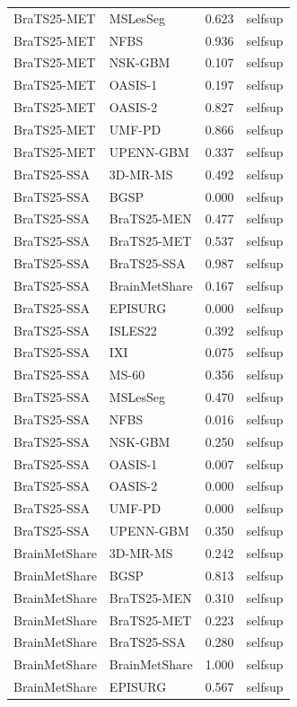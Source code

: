 \begin{tabular}{llrl}
BraTS25-MET & MSLesSeg & 0.623 & selfsup \\
BraTS25-MET & NFBS & 0.936 & selfsup \\
BraTS25-MET & NSK-GBM & 0.107 & selfsup \\
BraTS25-MET & OASIS-1 & 0.197 & selfsup \\
BraTS25-MET & OASIS-2 & 0.827 & selfsup \\
BraTS25-MET & UMF-PD & 0.866 & selfsup \\
BraTS25-MET & UPENN-GBM & 0.337 & selfsup \\
BraTS25-SSA & 3D-MR-MS & 0.492 & selfsup \\
BraTS25-SSA & BGSP & 0.000 & selfsup \\
BraTS25-SSA & BraTS25-MEN & 0.477 & selfsup \\
BraTS25-SSA & BraTS25-MET & 0.537 & selfsup \\
BraTS25-SSA & BraTS25-SSA & 0.987 & selfsup \\
BraTS25-SSA & BrainMetShare & 0.167 & selfsup \\
BraTS25-SSA & EPISURG & 0.000 & selfsup \\
BraTS25-SSA & ISLES22 & 0.392 & selfsup \\
BraTS25-SSA & IXI & 0.075 & selfsup \\
BraTS25-SSA & MS-60 & 0.356 & selfsup \\
BraTS25-SSA & MSLesSeg & 0.470 & selfsup \\
BraTS25-SSA & NFBS & 0.016 & selfsup \\
BraTS25-SSA & NSK-GBM & 0.250 & selfsup \\
BraTS25-SSA & OASIS-1 & 0.007 & selfsup \\
BraTS25-SSA & OASIS-2 & 0.000 & selfsup \\
BraTS25-SSA & UMF-PD & 0.000 & selfsup \\
BraTS25-SSA & UPENN-GBM & 0.350 & selfsup \\
BrainMetShare & 3D-MR-MS & 0.242 & selfsup \\
BrainMetShare & BGSP & 0.813 & selfsup \\
BrainMetShare & BraTS25-MEN & 0.310 & selfsup \\
BrainMetShare & BraTS25-MET & 0.223 & selfsup \\
BrainMetShare & BraTS25-SSA & 0.280 & selfsup \\
BrainMetShare & BrainMetShare & 1.000 & selfsup \\
BrainMetShare & EPISURG & 0.567 & selfsup \\

\end{tabular}
